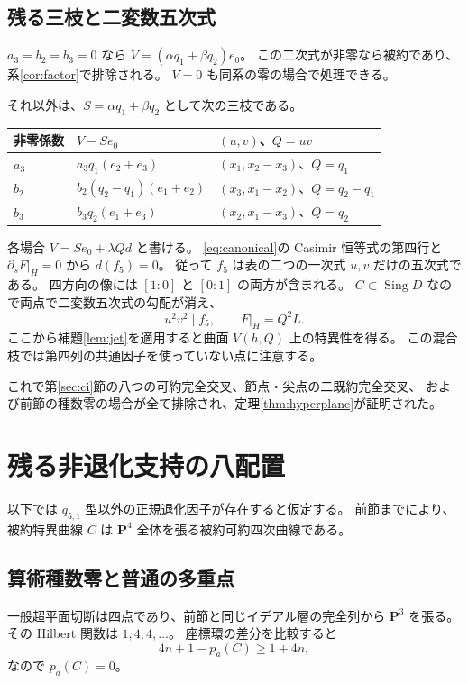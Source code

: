 \documentclass[11pt,a4paper]{ltjsarticle}
\newcommand{\PP}{\mathbf P}\renewcommand{\AA}{\mathbf A}
\theoremstyle{remark}\newtheorem{remark}[theorem]{注意}
\begin{document}
\subsection{残る三枝と二変数五次式}

$a_3=b_2=b_3=0$ なら $V=(\alpha q_1+\beta q_2)e_0$。
この二次式が非零なら被約であり、系\ref{cor:factor}で排除される。
$V=0$ も同系の零の場合で処理できる。

それ以外は、$S=\alpha q_1+\beta q_2$ として次の三枝である。
\begin{center}
\begin{tabular}{@{}lll@{}}
\toprule
非零係数 & $V-Se_0$ & $(u,v)$、$Q=uv$\\
\midrule
$a_3$ & $a_3q_1(e_2+e_3)$ & $(x_1,x_2-x_3)$、$Q=q_1$\\
$b_2$ & $b_2(q_2-q_1)(e_1+e_2)$ & $(x_3,x_1-x_2)$、$Q=q_2-q_1$\\
$b_3$ & $b_3q_2(e_1+e_3)$ & $(x_2,x_1-x_3)$、$Q=q_2$\\
\bottomrule
\end{tabular}
\end{center}
各場合 $V=Se_0+\lambda Qd$ と書ける。
\eqref{eq:canonical}の Casimir 恒等式の第四行と $\partial_sF|_H=0$ から
$d(f_5)=0$。
従って $f_5$ は表の二つの一次式 $u,v$ だけの五次式である。
四方向の像には $[1:0]$ と $[0:1]$ の両方が含まれる。
$C\subset\operatorname{Sing}D$ なので両点で二変数五次式の勾配が消え、
\[
u^2v^2\mid f_5,\qquad F|_H=Q^2L.
\]
ここから補題\ref{lem:jet}を適用すると曲面 $V(h,Q)$ 上の特異性を得る。
この混合枝では第四列の共通因子を使っていない点に注意する。

これで第\ref{sec:ci}節の八つの可約完全交叉、節点・尖点の二既約完全交叉、
および前節の種数零の場合が全て排除され、定理\ref{thm:hyperplane}が証明された。



\section{残る非退化支持の八配置}\label{sec:trees}

以下では $q_{5,1}$ 型以外の正規退化因子が存在すると仮定する。
前節までにより、被約特異曲線 $C$ は $\PP^4$ 全体を張る被約可約四次曲線である。

\subsection{算術種数零と普通の多重点}

一般超平面切断は四点であり、前節と同じイデアル層の完全列から $\PP^3$ を張る。
その Hilbert 関数は $1,4,4,\ldots$。
座標環の差分を比較すると
\[
4n+1-p_a(C)\ge1+4n,
\]
なので $p_a(C)=0$。
\end{document}
